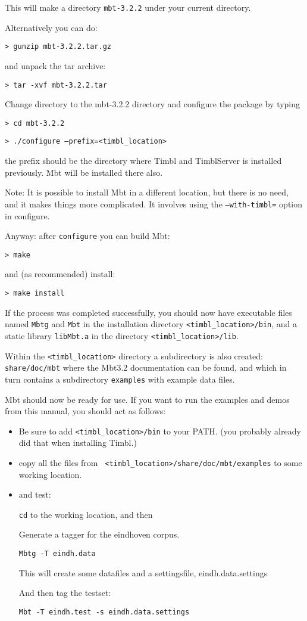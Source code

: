 \documentclass{report}
\begin{document}
This will make a directory {\tt mbt-3.2.2} under your current directory.

Alternatively you can do:

{\tt > gunzip mbt-3.2.2.tar.gz}

and unpack the tar archive:

{\tt > tar -xvf mbt-3.2.2.tar}

Change directory to the mbt-3.2.2 directory and configure the package by typing

{\tt > cd mbt-3.2.2}

{\tt > ./configure --prefix=<timbl\_location>}

the prefix should be the directory where Timbl and TimblServer is installed previously. Mbt will be installed there also.

Note: It is possible to install Mbt in a different location, but there
is no need, and it makes things more complicated. It involves using the
{\tt --with-timbl=} option in configure. 
 
Anyway: after {\tt configure} you can build Mbt:

{\tt > make}

and (as recommended) install:

{\tt > make install }

If the process was completed successfully, you should now have
executable files named {\tt Mbtg} and {\tt Mbt} in the installation directory
{\tt <timbl\_location>/bin}, and a static library {\tt libMbt.a} in
the directory {\tt <timbl\_location>/lib}.

Within the {\tt <timbl\_location>} directory a subdirectory is
also created: {\tt share/doc/mbt} where the Mbt3.2 documentation
can be found, and which in turn contains a subdirectory {\tt examples}
with example data files.

Mbt should now be ready for use. If you want to run the examples and
demos from this manual, you should act as follows:

\begin{itemize}
\item Be sure to add {\tt <timbl\_location>/bin} to your PATH. (you
  probably already did that when installing Timbl.)
\item copy all the files from {\tt
  <timbl\_location>/share/doc/mbt/examples} to some working
location. 
\item and test:

{\tt cd} to the working location, and then

Generate a tagger for the eindhoven corpus.

{\tt Mbtg -T eindh.data}

This will create some datafiles and a settingsfile,
eindh.data.settings

And then tag the testset:

{\tt Mbt -T eindh.test -s eindh.data.settings}
\end{itemize}
\end{document}
